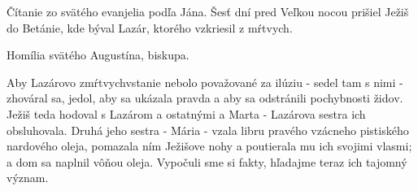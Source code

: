 Čítanie zo svätého evanjelia podľa Jána.
Šesť dní pred Veľkou nocou prišiel Ježiš do Betánie, kde býval Lazár, ktorého vzkriesil z mŕtvych.

Homília svätého Augustína, biskupa.

Aby Lazárovo zmŕtvychvstanie nebolo považované za ilúziu - sedel tam s nimi - zhováral sa, jedol, aby sa ukázala pravda a aby sa odstránili pochybnosti židov. Ježiš teda hodoval s Lazárom a ostatnými a Marta - Lazárova sestra ich obsluhovala. Druhá jeho sestra - Mária - vzala libru pravého vzácneho pistiského nardového oleja, pomazala ním Ježišove nohy a poutierala mu ich svojimi vlasmi; a dom sa naplnil vôňou oleja.
Vypočuli sme si fakty, hľadajme teraz ich tajomný význam.


